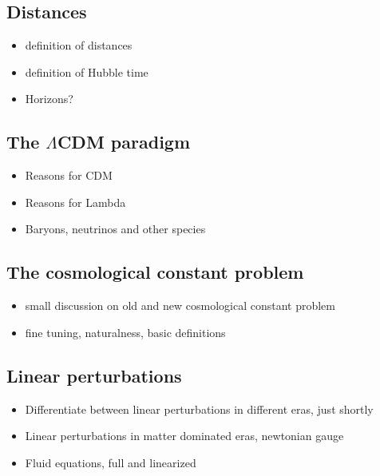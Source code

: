 \subsection{Distances}

\begin{itemize}
\item definition of distances
\item definition of Hubble time 
\item Horizons?
\end{itemize}


\subsection{The $\Lambda$CDM paradigm}

\begin{itemize}
\item Reasons for CDM
\item Reasons for Lambda
\item Baryons, neutrinos and other species
\end{itemize}

\subsection{The cosmological constant problem}

\begin{itemize}
\item small discussion on old and new cosmological constant problem
\item fine tuning, naturalness, basic definitions
\end{itemize}

\subsection{Linear perturbations}

\begin{itemize}
\item Differentiate between linear perturbations in different eras, just shortly
\item Linear perturbations in matter dominated eras, newtonian gauge
\item Fluid equations, full and linearized
\end{itemize}



